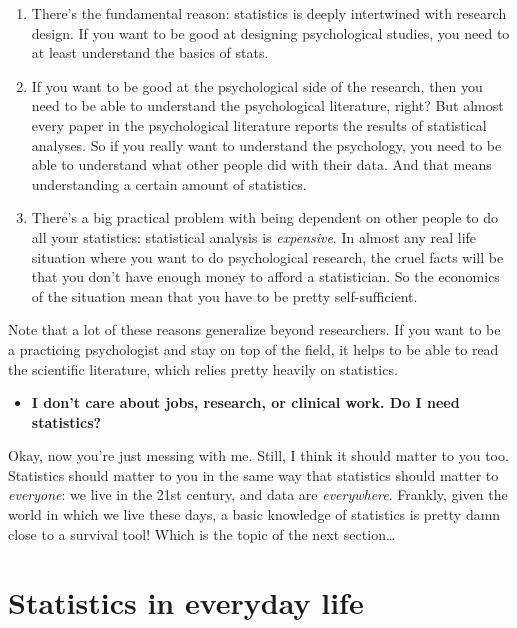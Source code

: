 \documentclass[]{book}
\providecommand{\tightlist}{%
  \setlength{\itemsep}{0pt}\setlength{\parskip}{0pt}}
\begin{document}
\begin{enumerate}
\def\labelenumi{\arabic{enumi}.}
\item
  There's the fundamental reason: statistics is deeply intertwined with research design. If you want to be good at designing psychological studies, you need to at least understand the basics of stats.
\item
  If you want to be good at the psychological side of the research, then you need to be able to understand the psychological literature, right? But almost every paper in the psychological literature reports the results of statistical analyses. So if you really want to understand the psychology, you need to be able to understand what other people did with their data. And that means understanding a certain amount of statistics.
\item
  There's a big practical problem with being dependent on other people to do all your statistics: statistical analysis is \emph{expensive}. In almost any real life situation where you want to do psychological research, the cruel facts will be that you don't have enough money to afford a statistician. So the economics of the situation mean that you have to be pretty self-sufficient.
\end{enumerate}

Note that a lot of these reasons generalize beyond researchers. If you want to be a practicing psychologist and stay on top of the field, it helps to be able to read the scientific literature, which relies pretty heavily on statistics.

\begin{itemize}
\tightlist
\item
  \textbf{I don't care about jobs, research, or clinical work. Do I need statistics?}
\end{itemize}

Okay, now you're just messing with me. Still, I think it should matter to you too. Statistics should matter to you in the same way that statistics should matter to \emph{everyone}: we live in the 21st century, and data are \emph{everywhere}. Frankly, given the world in which we live these days, a basic knowledge of statistics is pretty damn close to a survival tool! Which is the topic of the next section\ldots{}

\hypertarget{statistics-in-everyday-life}{%
\section{Statistics in everyday life}\label{statistics-in-everyday-life}}
\end{document}
